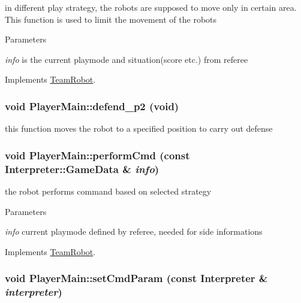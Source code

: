 in different play strategy, the robots are supposed to move only in certain area. This function is used to limit the movement of the robots 


\begin{DoxyParams}{Parameters}
\item[{\em info}]is the current playmode and situation(score etc.) from referee \end{DoxyParams}


Implements \hyperlink{classTeamRobot_a71ec65db46db1ac511fe17b668d4f192}{TeamRobot}.

\hypertarget{classPlayerMain_a64e1d5734e07cfa82b2571aa11bb4f9d}{
\subsubsection[{defend\_\-p2}]{\setlength{\rightskip}{0pt plus 5cm}void PlayerMain::defend\_\-p2 (void)}}
\label{classPlayerMain_a64e1d5734e07cfa82b2571aa11bb4f9d}


this function moves the robot to a specified position to carry out defense 

\hypertarget{classPlayerMain_af12a95c226ce973056681a138b55fb6c}{
\subsubsection[{performCmd}]{\setlength{\rightskip}{0pt plus 5cm}void PlayerMain::performCmd (const {\bf Interpreter::GameData} \& {\em info})}}
\label{classPlayerMain_af12a95c226ce973056681a138b55fb6c}


the robot performs command based on selected strategy 


\begin{DoxyParams}{Parameters}
\item[{\em info}]current playmode defined by referee, needed for side informations \end{DoxyParams}


Implements \hyperlink{classTeamRobot_a9b84df51ca16a7203fdb6498ea6741da}{TeamRobot}.

\hypertarget{classPlayerMain_a5c4af159392663660f91809052422945}{
\subsubsection[{setCmdParam}]{\setlength{\rightskip}{0pt plus 5cm}void PlayerMain::setCmdParam (const {\bf Interpreter} \& {\em interpreter})}}
\label{classPlayerMain_a5c4af159392663660f91809052422945}


